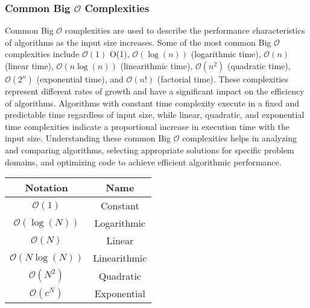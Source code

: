 \subsubsection{Common Big $\mathcal{O}$ Complexities}

Common Big $\mathcal{O}$ complexities are used to describe the performance characteristics of algorithms as the input size increases. Some of the most common Big $\mathcal{O}$ complexities include $\mathcal{O}(1)$ O(1), $\mathcal{O}(\log{(n)})$ (logarithmic time), $\mathcal{O}(n)$ (linear time), $\mathcal{O}(n\log{(n)})$ (linearithmic time), $\mathcal{O}(n^2)$ (quadratic time), $\mathcal{O}(2^n)$ (exponential time), and $\mathcal{O}(n!)$
(factorial time). These complexities represent different rates of growth and have a significant impact on the efficiency of algorithms. Algorithms with constant time complexity execute in a fixed and predictable time regardless of input size, while linear, quadratic, and exponential time complexities indicate a proportional increase in execution time with the input size. Understanding these common Big $\mathcal{O}$ complexities helps in 
analyzing and comparing algorithms, selecting appropriate solutions for specific problem domains, and optimizing code to achieve efficient algorithmic performance.

\begin{center}
    \begin{tabular}{|c|c|}
        \hline Notation & Name \\ \hline
        $\mathcal{O}(1)$ & Constant \\ \hline
        $\mathcal{O}(\log{(N)})$ & Logarithmic \\ \hline
        $\mathcal{O}(N)$ & Linear \\ \hline
        $\mathcal{O}(N\log{(N)})$ & Linearithmic \\ \hline
        $\mathcal{O}(N^2)$ & Quadratic \\ \hline
        $\mathcal{O}(c^N)$ & Exponential \\ \hline
    \end{tabular}
\end{center}

